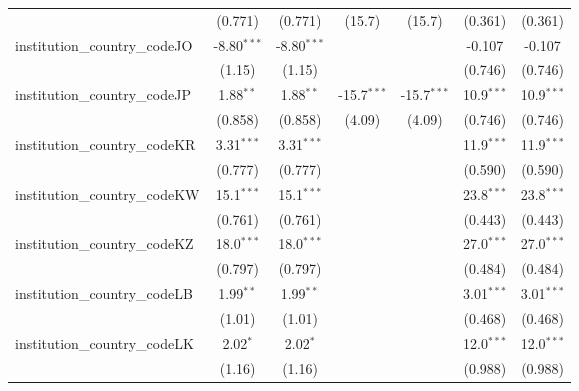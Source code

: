 \begin{tabular}{lcccccc}
                                         & (0.771)        & (0.771)        & (15.7)        & (15.7)        & (0.361)       & (0.361)\\   
   institution\_country\_codeJO          & -8.80$^{***}$  & -8.80$^{***}$  &               &               & -0.107        & -0.107\\   
                                         & (1.15)         & (1.15)         &               &               & (0.746)       & (0.746)\\   
   institution\_country\_codeJP          & 1.88$^{**}$    & 1.88$^{**}$    & -15.7$^{***}$ & -15.7$^{***}$ & 10.9$^{***}$  & 10.9$^{***}$\\   
                                         & (0.858)        & (0.858)        & (4.09)        & (4.09)        & (0.746)       & (0.746)\\   
   institution\_country\_codeKR          & 3.31$^{***}$   & 3.31$^{***}$   &               &               & 11.9$^{***}$  & 11.9$^{***}$\\   
                                         & (0.777)        & (0.777)        &               &               & (0.590)       & (0.590)\\   
   institution\_country\_codeKW          & 15.1$^{***}$   & 15.1$^{***}$   &               &               & 23.8$^{***}$  & 23.8$^{***}$\\   
                                         & (0.761)        & (0.761)        &               &               & (0.443)       & (0.443)\\   
   institution\_country\_codeKZ          & 18.0$^{***}$   & 18.0$^{***}$   &               &               & 27.0$^{***}$  & 27.0$^{***}$\\   
                                         & (0.797)        & (0.797)        &               &               & (0.484)       & (0.484)\\   
   institution\_country\_codeLB          & 1.99$^{**}$    & 1.99$^{**}$    &               &               & 3.01$^{***}$  & 3.01$^{***}$\\   
                                         & (1.01)         & (1.01)         &               &               & (0.468)       & (0.468)\\   
   institution\_country\_codeLK          & 2.02$^{*}$     & 2.02$^{*}$     &               &               & 12.0$^{***}$  & 12.0$^{***}$\\   
                                         & (1.16)         & (1.16)         &               &               & (0.988)       & (0.988)\\   

\end{tabular}
